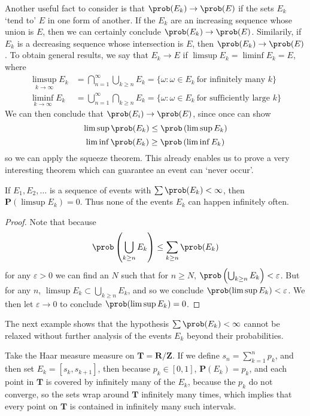Another useful fact to consider is that $\prob(E_k) \to \prob(E)$ if the sets $E_k$ `tend to' $E$ in one form of another. If the $E_k$ are an increasing sequence whose union is $E$, then we can certainly conclude $\prob(E_k) \to \prob(E)$. Similarily, if $E_k$ is a decreasing sequence whose intersection is $E$, then $\prob(E_k) \to \prob(E)$. To obtain general results, we say that $E_k \to E$ if $\limsup E_k = \liminf E_k = E$, where
%
\begin{align*}
    \limsup_{k \to \infty} E_k &= \bigcap_{n = 1}^\infty \bigcup_{k \geq n} E_k = \{ \omega : \omega \in E_k\ \text{for infinitely many $k$} \}\\
    \liminf_{k \to \infty} E_k &= \bigcup_{n = 1}^\infty \bigcap_{k \geq n} E_k = \{ \omega: \omega \in E_k\ \text{for sufficiently large $k$} \}
\end{align*}
%
We can then conclude that $\prob(E_i) \to \prob(E)$, since once can show
%
\[ \limsup \prob(E_k) \leq \prob \left( \limsup E_k \right) \]
\[ \liminf \prob(E_k) \geq \prob \left( \liminf E_k \right) \]
%
so we can apply the squeeze theorem. This already enables us to prove a very interesting theorem which can guarantee an event can `never occur'.

\begin{lemma}
    If $E_1, E_2, \dots$ is a sequence of events with $\sum \prob(E_k) < \infty$, then $\mathbf{P} \left( \limsup E_k \right) = 0$. Thus none of the events $E_k$ can happen infinitely often.
\end{lemma}
\begin{proof}
    Note that because
    \[ \prob \left( \bigcup_{k \geq n} E_k \right) \leq \sum_{k \geq n} \prob(E_k) \]
    for any $\varepsilon > 0$ we can find an $N$ such that for $n \geq N$, $\prob \left( \bigcup_{k \geq n} E_k \right) < \varepsilon$. But for any $n$, $\limsup E_k \subset \bigcup_{k \geq n} E_k$, and so we conclude $\prob(\limsup E_k) < \varepsilon$. We then let $\varepsilon \to 0$ to conclude $\prob(\limsup E_k) = 0$.
\end{proof}

The next example shows that the hypothesis $\sum \prob(E_k) < \infty$ cannot be relaxed without further analysis of the events $E_k$ beyond their probabilities.

\begin{example}
    Take the Haar measure measure on $\mathbf{T} = \mathbf{R}/\mathbf{Z}$. If we define $s_n = \sum_{k = 1}^n p_k$, and then set $E_k = [s_k, s_{k+1}]$, then because $p_k \in [0,1]$, $\mathbf{P}(E_k) = p_k$, and each point in $\mathbf{T}$ is covered by infinitely many of the $E_k$, because the $p_k$ do not converge, so the sets wrap around $\mathbf{T}$ infinitely many times, which implies that every point on $\mathbf{T}$ is contained in infinitely many such intervals.
\end{example}

